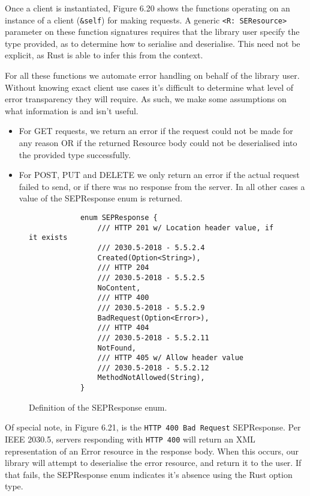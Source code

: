 Once a client is instantiated, Figure 6.20 shows the functions operating on an instance of a client (\texttt{\&self}) for making requests. A generic \texttt{<R: SEResource>} parameter on these function signatures requires that the library user specify the type provided, as to determine how to serialise and deserialise. This need not be explicit, as Rust is able to infer this from the context.

For all these functions we automate error handling on behalf of the library user. Without knowing exact client use cases it's difficult to determine what level of error transparency they will require. As such, we make some assumptions on what information is and isn't useful.

\begin{itemize}
    \item For GET requests, we return an error if the request could not be made for any reason OR if the returned Resource body could not be deserialised into the provided type successfully.
    \item For POST, PUT and DELETE we only return an error if the actual request failed to send, or if there was no response from the server. In all other cases a value of the SEPResponse enum is returned.
\end{itemize}

\begin{figure}[h]
    \begin{center}
        \begin{lstlisting}
            enum SEPResponse {
                /// HTTP 201 w/ Location header value, if it exists
                /// 2030.5-2018 - 5.5.2.4
                Created(Option<String>),
                /// HTTP 204
                /// 2030.5-2018 - 5.5.2.5
                NoContent,
                /// HTTP 400 
                /// 2030.5-2018 - 5.5.2.9
                BadRequest(Option<Error>),
                /// HTTP 404 
                /// 2030.5-2018 - 5.5.2.11
                NotFound,
                /// HTTP 405 w/ Allow header value 
                /// 2030.5-2018 - 5.5.2.12
                MethodNotAllowed(String),
            }
        \end{lstlisting}
        \label{fig:sepresponse}
        \vspace{-10pt}
        \caption{Definition of the SEPResponse enum.}
    \end{center}
\end{figure}

Of special note, in Figure 6.21, is the \texttt{HTTP 400 Bad Request} SEPResponse. Per IEEE 2030.5, servers responding with \texttt{HTTP 400} will return an XML representation of an Error resource in the response body. When this occurs, our library will attempt to deserialise the error resource, and return it to the user. If that fails, the SEPResponse enum indicates it's absence using the Rust option type.

